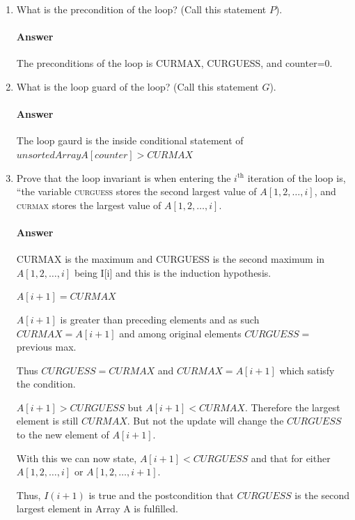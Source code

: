 \documentclass{article}
\begin{document}
\begin{enumerate}
    \item What is the precondition of the loop? (Call this statement $P$).

        \paragraph{Answer}

        The preconditions of the loop is CURMAX, CURGUESS, and counter=0.

    \item What is the loop guard of the loop? (Call this statement $G$).

        \paragraph{Answer}

        The loop gaurd is the inside conditional statement of $unsortedArrayA[counter] > CURMAX$

    \item Prove that the loop invariant is when entering the $i^\text{th}$
        iteration of the loop is, ``the variable \textsc{curguess} stores
        the second
        largest value of $A[1,2, \ldots, i]$,
        and \textsc{curmax} stores the largest value of $A[1,2,\ldots, i]$.

        \paragraph{Answer}

        CURMAX is the maximum and CURGUESS is the second maximum in $A[1,2,\ldots, i]$
        being I[i] and this is the induction hypothesis.

        $A[i+1] = CURMAX$

        $A[i+1]$ is greater than preceding elements and as such $CURMAX = A[i+1]$
        and among original elements $CURGUESS =$ previous max.

        Thus $CURGUESS = CURMAX$ and $CURMAX = A[i+1]$ which satisfy the condition.

        $A[i+1] > CURGUESS$ but $A[i+1] < CURMAX$.
        Therefore the largest element is still $CURMAX$. But not the update will
        change the $CURGUESS$ to the new element of $A[i+1]$.

        With this we can now state, $A[i+1] < CURGUESS$ and that for either $A[1,2,\ldots, i]$
        or $A[1,2,\ldots, i+1]$.

        Thus, $I(i+1)$ is true and the postcondition that $CURGUESS$ is the second largest
        element in Array A is fulfilled.


\end{enumerate}
\end{document}
